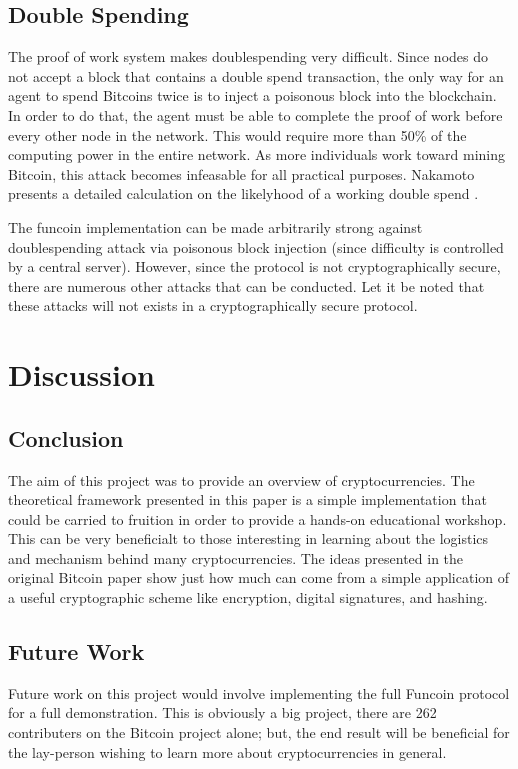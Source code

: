 \documentclass[12pt]{article}
\begin{document}
\subsection{Double Spending}\label{doublespend}
The proof of work system makes doublespending very difficult. Since nodes do not accept a block that contains a double spend transaction, the only way for an agent to spend Bitcoins twice is to inject a poisonous block into the blockchain. In order to do that, the agent must be able to complete the proof of work before every other node in the network. This would require more than 50\% of the computing power in the entire network. As more individuals work toward mining Bitcoin, this attack becomes infeasable for all practical purposes. Nakamoto presents a detailed calculation on the likelyhood of a working double spend \cite{nakamoto:bitcoin}.

The funcoin implementation can be made arbitrarily strong against doublespending attack via poisonous block injection (since difficulty is controlled by a central server). However, since the protocol is not cryptographically secure, there are numerous other attacks that can be conducted. Let it be noted that these attacks will not exists in a cryptographically secure protocol.

\section{Discussion}\label{future}
\subsection{Conclusion}
The aim of this project was to provide an overview of cryptocurrencies. The theoretical framework presented in this paper is a simple implementation that could be carried to fruition in order to provide a hands-on educational workshop. This can be very beneficialt to those interesting in learning about the logistics and mechanism behind many cryptocurrencies. The ideas presented in the original Bitcoin paper show just how much can come from a simple application of a useful cryptographic scheme like encryption, digital signatures, and hashing. 

\subsection{Future Work}\label{work}
Future work on this project would involve implementing the full Funcoin protocol for a full demonstration. This is obviously a big project, there are 262 contributers on the Bitcoin project alone; but, the end result will be beneficial for the lay-person wishing to learn more about cryptocurrencies in general.
\end{document}
